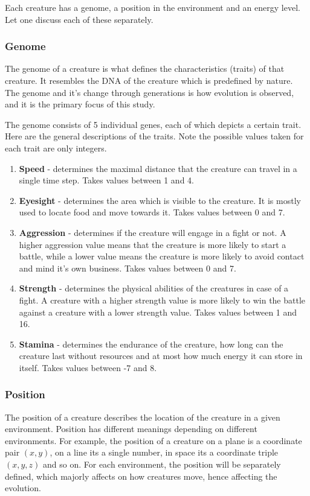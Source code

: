 \documentclass{article}
\begin{document}
Each creature has a genome, a position in the environment and an energy level. Let one discuss each of these separately.

\subsubsection{Genome}

The genome of a creature is what defines the characteristics (traits) of that creature. It resembles the DNA of the creature which is predefined by nature. The genome and it's change through generations is how evolution is observed, and it is the primary focus of this study.

The genome consists of 5 individual genes, each of which depicts a certain trait. Here are the general descriptions of the traits. Note the possible values taken for each trait are only integers.

\begin{enumerate}
    \item \textbf{Speed} - determines the maximal distance that the creature can travel in a single time step. Takes values between 1 and 4.
    \item \textbf{Eyesight} - determines the area which is visible to the creature. It is mostly used to locate food and move towards it. Takes values between 0 and 7.
    \item \textbf{Aggression} - determines if the creature will engage in a fight or not. A higher aggression value means that the creature is more likely to start a battle, while a lower value means the creature is more likely to avoid contact and mind it's own business. Takes values between 0 and 7.
    \item \textbf{Strength} - determines the physical abilities of the creatures in case of a fight. A creature with a higher strength value is more likely to win the battle against a creature with a lower strength value. Takes values between 1 and 16.
    \item \textbf{Stamina} - determines the endurance of the creature, how long can the creature last without resources and at most how much energy it can store in itself. Takes values between -7 and 8.
\end{enumerate}

\subsubsection{Position}

The position of a creature describes the location of the creature in a given environment. Position has different meanings depending on different environments. For example, the position of a creature on a plane is a coordinate pair $(x, y)$, on a line its a single number, in space its a coordinate triple $(x, y, z)$ and so on. For each environment, the position will be separately defined, which majorly affects on how creatures move, hence affecting the evolution.
\end{document}
